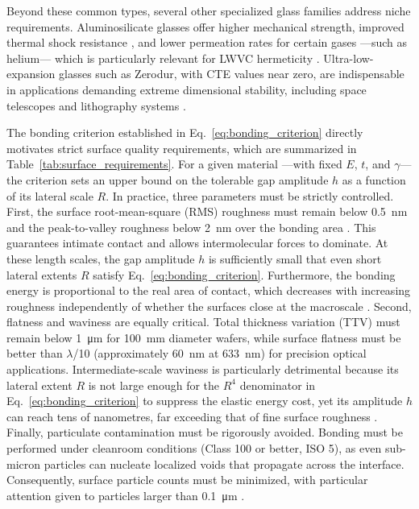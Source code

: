 Beyond these common types, several other specialized glass families address 
niche requirements. Aluminosilicate glasses offer higher mechanical strength, improved 
thermal shock resistance \cite{yang2023}, and lower permeation rates for certain 
gases ---such as helium--- which is particularly relevant for LWVC hermeticity 
\cite{carle2023, dellis2016}. Ultra-low-expansion glasses such as Zerodur, 
with CTE values near zero, are indispensable in applications demanding extreme 
dimensional stability, including space telescopes and lithography systems 
\cite{jedamzik2014}.

The bonding criterion established in Eq.~\eqref{eq:bonding_criterion} directly motivates 
strict surface quality requirements, which are summarized in 
Table~\ref{tab:surface_requirements}. For a given material ---with fixed $E$, 
$t$, and $\gamma$--- the criterion sets an upper bound on the tolerable gap 
amplitude $h$ as a function of its lateral scale $R$. In practice, three parameters 
must be strictly controlled. First, the surface root-mean-square (RMS) roughness must 
remain below \SI{0.5}{\nano\meter} and the peak-to-valley roughness below 
\SI{2}{\nano\meter} over the bonding area \cite{gosele2006}. This guarantees intimate 
contact and allows intermolecular forces to dominate. At these length scales, the gap 
amplitude $h$ is sufficiently small that even short lateral extents $R$ satisfy 
Eq.~\eqref{eq:bonding_criterion}. Furthermore, the bonding energy is proportional to the 
real area of contact, which decreases with increasing roughness independently of whether 
the surfaces close at the macroscale \cite{miki2003}. Second, flatness and waviness 
are equally critical. Total thickness variation (TTV) must remain below \SI{1}{\micro\meter} 
for \SI{100}{\milli\meter} diameter wafers, while surface flatness must be better than 
$\lambda$/10 (approximately \SI{60}{\nano\meter} at \SI{633}{\nano\meter}) for 
precision optical applications. Intermediate-scale waviness is particularly detrimental 
because its lateral extent $R$ is not large enough for the $R^{4}$ denominator in 
Eq.~\eqref{eq:bonding_criterion} to suppress the elastic energy cost, yet its amplitude $h$ 
can reach tens of nanometres, far exceeding that of fine surface roughness 
\cite{kalk2014, turner2002}. Finally, particulate contamination must be rigorously avoided. 
Bonding must be performed under cleanroom conditions (Class 100 or better, ISO 5), as even 
sub-micron particles can nucleate localized voids that propagate across the interface. 
Consequently, surface particle counts must be minimized, with particular attention given 
to particles larger than \SI{0.1}{\micro\meter} \cite{du2022}.


